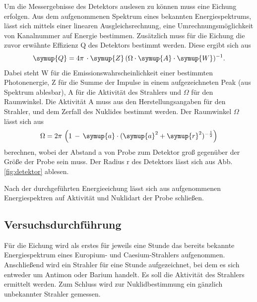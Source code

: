 \noindent
Um die Messergebnisse des Detektors auslesen zu können muss eine Eichung erfolgen.
Aus dem aufgenommenen Spektrum eines bekannten Energiespektrums, lässt sich mittels einer linearen
Ausgleichsrechnung, eine Umrechnungsmöglichkeit von Kanalnummer auf Energie bestimmen.
Zusätzlich muss für die Eichung die zuvor erwähnte Effizienz Q des Detektors bestimmt werden.
Diese ergibt sich aus
\begin{align}
  \symup{Q} = 4\pi\,\cdot\symup{Z}\,(\Omega\cdot\symup{A}\cdot\symup{W})^{-1}.
\end{align}
Dabei steht W für die Emissionswahrscheinlichkeit einer bestimmten Photonenergie, Z für
die Summe der Impulse in einem aufgezeichneten Peak (aus Spektrum ablesbar), A für die
Aktivität des Strahlers und $\Omega$ für den Raumwinkel. Die Aktivität A muss aus den
Herstellungsangaben für den Strahler, und dem Zerfall des Nuklides bestimmt werden. Der
Raumwinkel $\Omega$ lässt sich aus
\begin{align}
  \Omega = 2\pi\,\left(1\,-\,\symup{a}\cdot(\symup{a}^2+\symup{r}^2)^{-\frac{1}{2}}\right)
\end{align}
berechnen, wobei der Abstand a von Probe zum Detektor groß gegenüber der Größe der Probe sein muss.
Der Radius r des Detektors lässt sich aus Abb. \ref{fig:detektor} ablesen.

Nach der durchgeführten Energieeichung lässt sich aus aufgenommenen Energiespektren
auf Aktivität und Nuklidart der Probe schließen.

\subsection{Versuchsdurchführung}

Für die Eichung wird als erstes für jeweils eine Stunde das bereits bekannte Energiespektrum eines
Europium- und Caesium-Strahlers aufgenommen. Anschließend wird ein Strahler für eine Stunde
aufgezeichnet, bei dem es sich entweder um Antimon oder Barium handelt. Es soll die Aktivität des
Strahlers ermittelt werden.
Zum Schluss wird zur Nuklidbestimmung ein gänzlich unbekannter Strahler gemessen.
